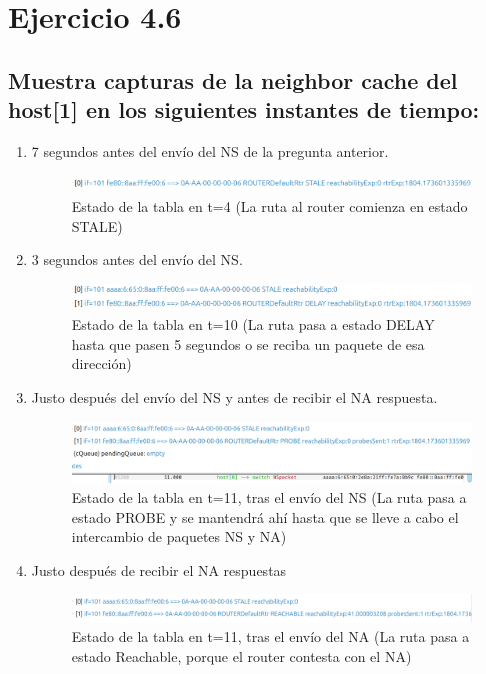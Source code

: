 \section{Ejercicio 4.6}
\subsection{Muestra capturas de la neighbor cache del host[1] en los siguientes instantes de tiempo:}

\begin{enumerate}
    \item 7 segundos antes del envío del NS de la pregunta anterior.
    \begin{figure}[H]
        \centering
        \includegraphics[width=135mm, scale=0.75]{imaxes/ejercicio4_5_1.png}
        \caption{Estado de la tabla en t=4 (La ruta al router comienza en estado STALE)}
        \label{fig:51}
    \end{figure}
    \item 3 segundos antes del envío del NS.
    \begin{figure}[H]
        \centering
        \includegraphics[width=135mm, scale=0.75]{imaxes/ejercicio4_5_2.png}
        \caption{Estado de la tabla en t=10 (La ruta pasa a estado DELAY hasta que pasen 5 segundos o se reciba un paquete de esa dirección)}
        \label{fig:52}
    \end{figure}
    \item Justo después del envío del NS y antes de recibir el NA respuesta.
    \begin{figure}[H]
        \centering
        \includegraphics[width=135mm, scale=0.75]{imaxes/ejercicio4_5_3.png}
        \caption{Estado de la tabla en t=11, tras el envío del NS (La ruta pasa a estado PROBE y se mantendrá ahí hasta que se lleve a cabo el intercambio de paquetes NS y NA)}
        \label{fig:53}
    \end{figure}
    \item Justo después de recibir el NA respuestas
    \begin{figure}[H]
        \centering
        \includegraphics[width=135mm, scale=0.75]{imaxes/ejercicio4_5_4.png}
        \caption{Estado de la tabla en t=11, tras el envío del NA (La ruta pasa a estado Reachable, porque el router contesta con el NA)}
        \label{fig:54}
    \end{figure}
\end{enumerate}
